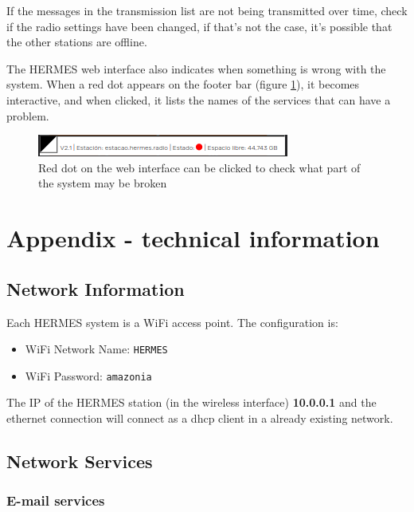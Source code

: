 \documentclass[11pt,a4paper]{article}
\begin{document}
If the messages in the transmission list are not being transmitted over time, check if the radio settings have been changed, if that's not the case, it's possible that the other stations are offline.

The HERMES web interface also indicates when something is wrong with the system. When a red dot appears on the footer bar (figure \ref{fig:status}), it becomes interactive, and when clicked, it lists the names of the services that can have a problem.

\begin{figure}[H]
    \centering
    \includegraphics[width=0.8\columnwidth]{screenshots/frontend/es/status.png}
    	\caption{Red dot on the web interface can be clicked to check what part of the system may be broken}
    \label{fig:status}
\end{figure}


\pagebreak
{}
\label{techinfo}
\section{Appendix - technical information}
\subsection{Network Information}
\label{apx_net_info}

Each HERMES system is a WiFi access point. The configuration is:
\begin{itemize}
\item WiFi Network Name: \texttt{HERMES}
\item WiFi Password: \texttt{amazonia}
\end{itemize}

The IP of the HERMES station (in the wireless interface) \textbf{10.0.0.1} and the ethernet connection will connect as a dhcp client in a already existing network. 

\subsection{Network Services} 
\label{apx_net_services}

\subsubsection{E-mail services}
\label{apx_net_email}
\end{document}
